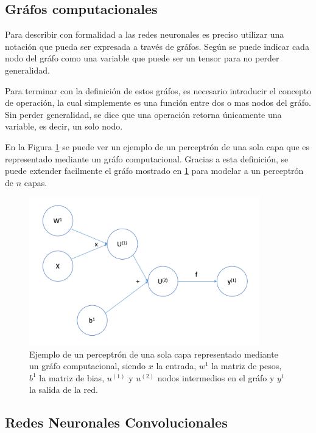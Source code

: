 	\subsection{Gráfos computacionales}
	Para describir con formalidad a las redes neuronales es preciso utilizar una notación que pueda ser expresada a través de gráfos. Según \cite{deeplearningbook} se puede indicar cada nodo del gráfo como una variable que puede ser un tensor para no perder generalidad. 
	
	Para terminar con la definición de estos gráfos, es necesario introducir el concepto de operación, la cual simplemente es una función entre dos o mas nodos del gráfo. Sin perder generalidad, se dice que una operación retorna únicamente una variable, es decir, un solo nodo.
	
	En la Figura \ref{fig:grafo-computacional} se puede ver un ejemplo de un perceptrón de una sola capa que es representado mediante un gráfo computacional. Gracias a esta definición, se puede extender facilmente el gráfo mostrado en \ref{fig:grafo-computacional} para modelar a un perceptrón de $n$ capas.
	
	\begin{figure}[h]
		\centering
		\includegraphics[width=10cm]{capitulo2/images/grafo}
		\caption{Ejemplo de un perceptrón de una sola capa representado mediante un gráfo computacional, siendo $x$ la entrada, $w^{1}$ la matriz de pesos, $b^{1}$ la matriz de bias, $u^{(1)}$ y $u^{(2)}$ nodos intermedios en el gráfo y $y^{1}$ la salida de la red.}
		\label{fig:grafo-computacional}
	\end{figure}

    
    \subsection{Redes Neuronales Convolucionales}
    
